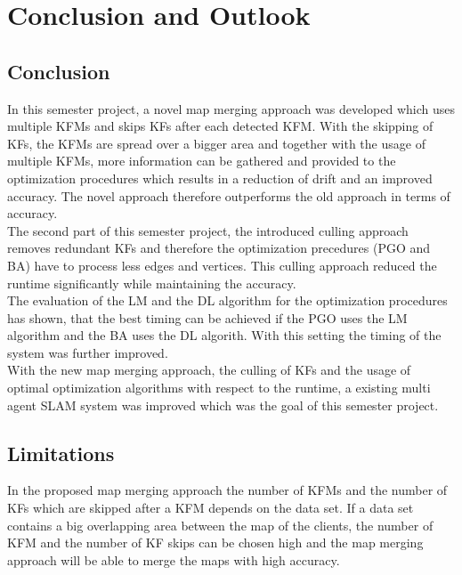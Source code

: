 \chapter{Conclusion and Outlook}

\section{Conclusion}
In this semester project, a novel map merging approach was developed which uses multiple \acp{KFM} and skips \acp{KF} after each detected \ac{KFM}. With the skipping of \acp{KF}, the \acp{KFM} are spread over a bigger area and together with the usage of multiple \acp{KFM}, more information can be gathered and provided to the optimization procedures which results in a reduction of drift and an improved accuracy. The novel approach therefore outperforms the old approach in terms of accuracy.\\

The second part of this semester project, the introduced culling approach removes redundant \acp{KF} and therefore the optimization precedures (\ac{PGO} and \ac{BA}) have to process less edges and vertices. This culling approach reduced the runtime significantly while maintaining the accuracy.\\

The evaluation of the \ac{LM} and the \ac{DL} algorithm for the optimization procedures has shown, that the best timing can be achieved if the \ac{PGO} uses the \ac{LM} algorithm and the \ac{BA} uses the \ac{DL} algorith. With this setting the timing of the system was further improved.\\

With the new map merging approach, the culling of \acp{KF} and the usage of optimal optimization algorithms with respect to the runtime, a existing multi agent \ac{SLAM} system was improved which was the goal of this semester project.

\section{Limitations}
In the proposed map merging approach the number of \acp{KFM} and the number of \acp{KF} which are skipped after a \ac{KFM} depends on the data set. If a data set contains a big overlapping area between the map of the clients, the number of \ac{KFM} and the number of \ac{KF} skips can be chosen high and the map merging approach will be able to merge the maps with high accuracy.

